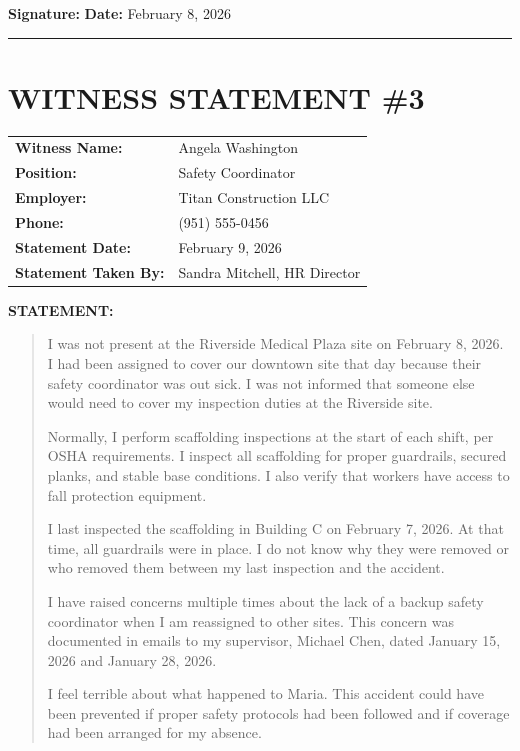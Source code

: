 \documentclass[11pt]{article}
\begin{document}
\vspace{1em}

\noindent\textbf{Signature:} \underline{\hspace{5cm}} \hfill \textbf{Date:} February 8, 2026

\vspace{3em}
\hrule
\vspace{2em}

\section*{WITNESS STATEMENT \#3}

\begin{tabular}{@{}p{4cm}p{10cm}@{}}
\textbf{Witness Name:} & Angela Washington \\
\textbf{Position:} & Safety Coordinator \\
\textbf{Employer:} & Titan Construction LLC \\
\textbf{Phone:} & (951) 555-0456 \\
\textbf{Statement Date:} & February 9, 2026 \\
\textbf{Statement Taken By:} & Sandra Mitchell, HR Director \\
\end{tabular}

\vspace{1em}

\noindent\textbf{STATEMENT:}

\begin{quote}
I was not present at the Riverside Medical Plaza site on February 8, 2026. I had been assigned to cover our downtown site that day because their safety coordinator was out sick. I was not informed that someone else would need to cover my inspection duties at the Riverside site.

Normally, I perform scaffolding inspections at the start of each shift, per OSHA requirements. I inspect all scaffolding for proper guardrails, secured planks, and stable base conditions. I also verify that workers have access to fall protection equipment.

I last inspected the scaffolding in Building C on February 7, 2026. At that time, all guardrails were in place. I do not know why they were removed or who removed them between my last inspection and the accident.

I have raised concerns multiple times about the lack of a backup safety coordinator when I am reassigned to other sites. This concern was documented in emails to my supervisor, Michael Chen, dated January 15, 2026 and January 28, 2026.

I feel terrible about what happened to Maria. This accident could have been prevented if proper safety protocols had been followed and if coverage had been arranged for my absence.
\end{quote}
\end{document}
